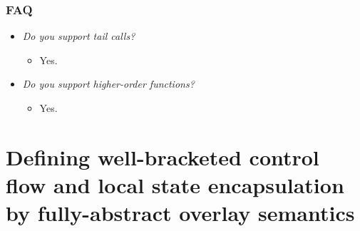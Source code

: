 \documentclass[aspectratio=169]{beamer}
\begin{document}
\begin{frame}
  \frametitle{\stktokens{} FAQ}
  \begin{itemize}
  \item \textit{Do you support tail calls?}
    \begin{itemize}
    \item Yes.
    \end{itemize}
  \item \textit{Do you support higher-order functions?}
    \begin{itemize}
    \item Yes.
    \end{itemize}
  \end{itemize}
\end{frame}

\section{Defining well-bracketed control flow and local state encapsulation by fully-abstract overlay semantics}
\end{document}
